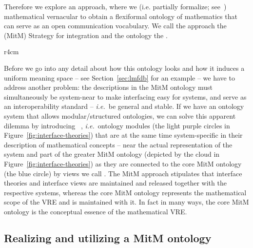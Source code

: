 Therefore we explore an approach, where we  (i.e. partially formalize;
see~\cite{Kohlhase:tffm13}) mathematical vernacular to obtain a flexiformal ontology of
mathematics that can serve as an open communication vocabulary. We call the approach the
 (MitM) Strategy for integration and the ontology the .

\begin{wrapfigure}r{4cm}%
  \vspace*{-.5em}
  \caption{Interface theories}\label{fig:interface-theories}\vspace*{-1em}
\end{wrapfigure}
Before we go into any detail about how this ontology looks and how it induces a uniform
meaning space -- see Section~\ref{sec:lmfdb} for an example -- we have to address another
problem: the descriptions in the MitM ontology must simultaneously be system-near to make
interfacing easy for systems, and serve as an interoperability standard -- \emph{i.e.}\ be
general and stable. If we have an ontology system that allows modular/structured
ontologies, we can solve this apparent dilemma by introducing ~\cite{KohRabSac:fvip11}, \emph{i.e.}\ ontology modules (the light purple
circles in Figure~\ref{fig:interface-theories}) that are at the same time system-specific
in their description of mathematical concepts -- near the actual representation of the
system and part of the greater MitM ontology (depicted by the cloud in
Figure~\ref{fig:interface-theories}) as they are connected to the core MitM ontology (the
blue circle) by views we call .  The MitM approach stipulates
that interface theories and interface views are maintained and released together with the
respective systems, whereas the core MitM ontology represents the mathematical scope of
the VRE and is maintained with it. In fact in many ways, the core MitM ontology is the
conceptual essence of the mathematical VRE.

\subsection{Realizing and utilizing a MitM ontology}

